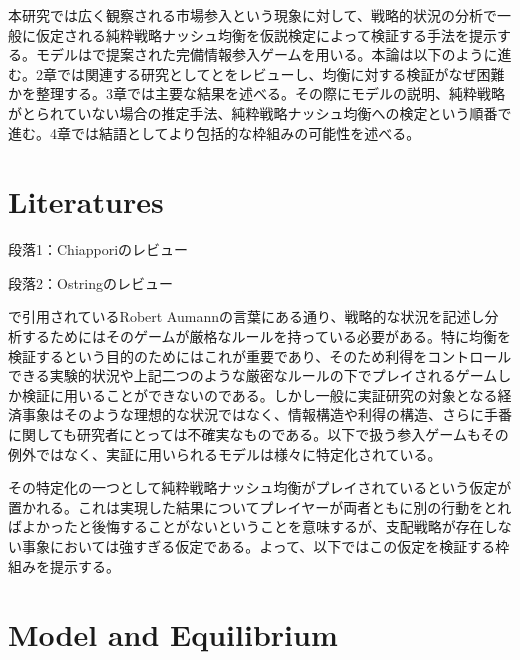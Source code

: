 \documentclass{jsarticle}
\begin{document}
本研究では広く観察される市場参入という現象に対して、戦略的状況の分析で一般に仮定される純粋戦略ナッシュ均衡を仮説検定によって検証する手法を提示する。モデルは\cite{2}で提案された完備情報参入ゲームを用いる。本論は以下のように進む。2章では関連する研究として\cite{11}と\cite{13}をレビューし、均衡に対する検証がなぜ困難かを整理する。3章では主要な結果を述べる。その際にモデルの説明、純粋戦略がとられていない場合の推定手法、純粋戦略ナッシュ均衡への検定という順番で進む。4章では結語としてより包括的な枠組みの可能性を述べる。


\section{Literatures}
段落1：Chiapporiのレビュー

段落2：Ostringのレビュー

\cite{11}で引用されているRobert Aumannの言葉にある通り、戦略的な状況を記述し分析するためにはそのゲームが厳格なルールを持っている必要がある。特に均衡を検証するという目的のためにはこれが重要であり、そのため利得をコントロールできる実験的状況や上記二つのような厳密なルールの下でプレイされるゲームしか検証に用いることができないのである。しかし一般に実証研究の対象となる経済事象はそのような理想的な状況ではなく、情報構造や利得の構造、さらに手番に関しても研究者にとっては不確実なものである。以下で扱う参入ゲームもその例外ではなく、実証に用いられるモデルは様々に特定化されている。

その特定化の一つとして純粋戦略ナッシュ均衡がプレイされているという仮定が置かれる。これは実現した結果についてプレイヤーが両者ともに別の行動をとればよかったと後悔することがないということを意味するが、支配戦略が存在しない事象においては強すぎる仮定である。よって、以下ではこの仮定を検証する枠組みを提示する。

\section{Model and Equilibrium}
\end{document}
